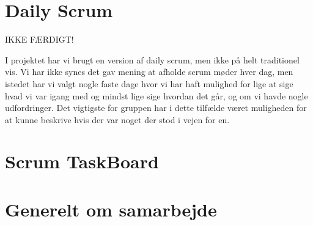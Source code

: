 \section{Daily Scrum}
IKKE FÆRDIGT!

I projektet har vi brugt en version af daily scrum, men ikke på helt traditionel vis. Vi har ikke synes det gav mening at afholde scrum møder hver dag, men istedet har vi valgt nogle faste dage hvor vi har haft mulighed for lige at sige hvad vi var igang med og mindst lige sige hvordan det går, og om vi havde nogle udfordringer. Det vigtigste for gruppen har i dette tilfælde været muligheden for at kunne beskrive hvis der var noget der stod i vejen for en. 

\section{Scrum TaskBoard}

\section{Generelt om samarbejde}